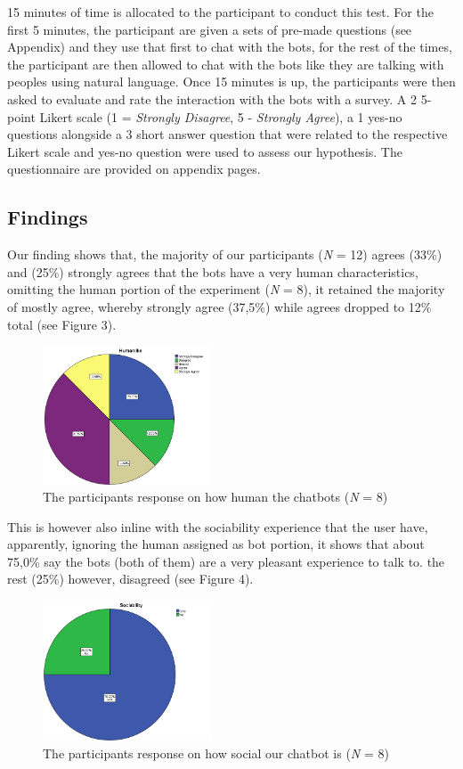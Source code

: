 \documentclass{vgtc}                          %
\begin{document}
15 minutes of time is allocated to the participant to conduct this test. For the first 5 minutes, the participant are given a sets of pre-made questions (see Appendix) and they use that first to chat with the bots, for the rest of the times, the participant are then allowed to chat with the bots like they are talking with peoples using natural language. 
Once 15 minutes is up, the participants were then asked to evaluate and rate the interaction with the bots with a survey. A 2 5-point Likert scale (1 = \textit{Strongly Disagree}, 5 - \textit{Strongly Agree}), a 1 yes-no questions alongside a 3 short answer question that were related to the respective Likert scale and yes-no question were used to assess our hypothesis. The questionnaire are provided on appendix pages.

\subsection{Findings}
Our finding shows that, the majority of our participants (\textit{N} = 12) agrees (33\%) and (25\%) strongly agrees that the bots have a very human characteristics, omitting the human portion of the experiment (\textit{N} = 8), it retained the majority of mostly agree, whereby strongly agree (37,5\%) while agrees dropped to 12\% total (see Figure 3).

{
\begin{figure}[ht]
\centering
\caption{The participants response on how human the chatbots (\textit{N} = 8)}
\includegraphics[width=5cm]{Humanlike.png}
\end{figure}
}

This is however also inline with the sociability experience that the user have, apparently, ignoring the human assigned as bot portion, it shows that about 75,0\% say the bots (both of them) are a very pleasant experience to talk to. the rest (25\%) however, disagreed (see Figure 4).

{
\begin{figure}[h]
\centering
\caption{The participants response on how social our chatbot is (\textit{N} = 8)}
\includegraphics[width=5cm]{Sociability.png}
\end{figure}
}
\end{document}
